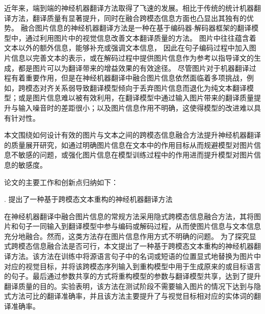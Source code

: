 近年来，端到端的神经机器翻译方法取得了飞速的发展。相比于传统的统计机器翻译方法，翻译质量有显著提升，同时在融合跨模态信息方面也凸显出其独有的优势。
融合图片信息的神经机器翻译方法是一种在基于编码器-解码器框架的翻译模型中，通过利用图片中的视觉信息改善文本翻译质量的方法。
图片中往往蕴含着文本以外的额外信息，能够补充或强调文本信息，%
因此在句子编码过程中加入图片信息以完善文本的表示，或在解码过程中提供图片信息作为参考以指导译文的生成，都是图片可以为翻译带来的增益效果的有效途径。
尽管图片对于机器翻译过程有着重要作用，但是在神经机器翻译中融合图片信息依然面临着多项挑战，例如，跨模态对齐关系弱导致翻译模型倾向于丢弃图片信息而退化为纯文本翻译模型；或是图片信息难以被有效利用，在翻译模型中通过输入图片带来的翻译质量提升与输入噪音时的差距很小；以及图片信息作用不明确，这使得模型的改进难以具有针对性。

本文围绕如何设计有效的图片与文本之间的跨模态信息融合方法提升神经机器翻译的质量展开研究，如通过明确图片信息在文本中的作用目标从而规避模型对图片信息不敏感的问题，或强化图片信息在模型训练过程中的作用进而提升模型对图片信息的敏感度。

论文的主要工作和创新点归纳如下：

{. 提出了一种基于跨模态文本重构的神经机器翻译方法}

在神经机器翻译中融合图片信息的常规方法采用隐式跨模态信息融合方法，其将图片和句子一同输入到翻译模型中参与编码或解码过程，从而使图片信息与文本信息充分地融合。然而，这类方法存在图片信息作用方式不明确的问题。%
为了探究显式跨模态信息融合法是否可行，本文提出了一种基于跨模态文本重构的神经机器翻译方法。该方法在训练中将源语言句子中的名词或短语的位置显式地替换为图片中对应的视觉目标，并将该跨模态序列输入到重构模型中用于生成原来的或目标语言的句子。最后通过参数共享的方式将重构模型的参数与翻译模型共享，达到了提升翻译质量的目的。实验表明，该方法在测试阶段不需要输入图片的情况下达到与隐式方法可比的翻译准确率，并且该方法主要提升了与视觉目标相对应的实体词的翻译准确率。

